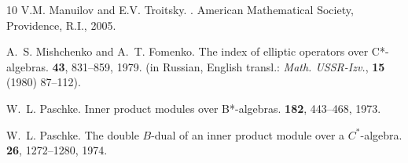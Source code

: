 \documentclass[12pt]{amsart}
\begin{document}
\begin{thebibliography}{10}
{\sc V.M. Manuilov and E.V. Troitsky}.
.
\newblock American Mathematical Society, Providence, R.I., 2005.

{\sc A.~S. Mishchenko and A.~T. Fomenko}.
\newblock The index of elliptic operators over {C*}-algebras.
 {\bf 43}, 831--859, 1979.
\newblock (in Russian, English transl.: {\em Math. USSR-Izv.}, {\bf 15\,}
  (1980) 87--112).

{\sc W.~L. Paschke}.
\newblock Inner product modules over {B*}-algebras.
 {\bf 182}, 443--468, 1973.

{\sc W.~L. Paschke}.
\newblock The double ${B}$-dual of an inner product module over a
  ${C}^*$-algebra.
 {\bf 26}, 1272--1280, 1974.

\end{thebibliography}
\end{document}
